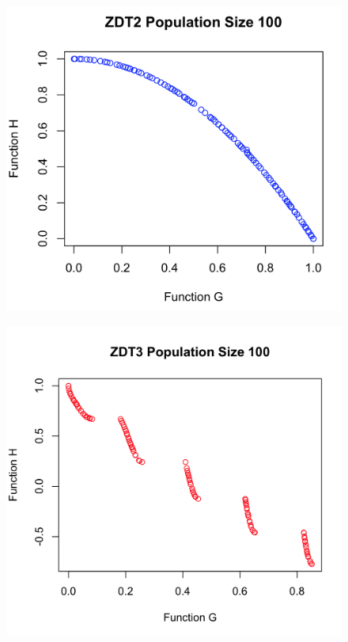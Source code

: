 \documentclass[a4paper,12pt]{article}
\begin{document}
\begin{figure}[h]
\centering
\begin{minipage}{.5\textwidth}
  \centering
  \includegraphics[width=.8\linewidth]{q1graphs/zdt2_100.png}
  \label{fig:zdt2100}
\end{minipage}%
\begin{minipage}{.5\textwidth}
  \centering
  \includegraphics[width=.8\linewidth]{q1graphs/zdt3_100.png}
  \label{fig:zdt3100}
\end{minipage}
\end{figure}
\end{document}
